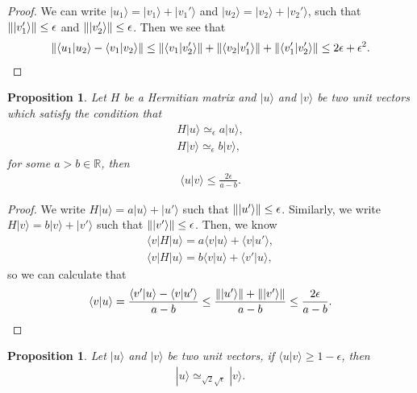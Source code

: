 \documentclass[11pt,letterpaper]{article}
\newcommand{\ket}[1]{|#1\rangle}
\newcommand{\bra}[1]{\langle#1|}
\newcommand{\braket}[2]{\langle#1|#2\rangle}
\DeclarePairedDelimiter{\norm}{\lVert}{\rVert}
\newcommand{\R}{\mathbb{R}}
\newcommand{\1}{\mathbb{1}}
\newcommand{\ep}{\epsilon}
\newcommand{\se}{\sqrt{\epsilon}}
\newcommand{\appd}[1]{\simeq_{#1}}
\newtheorem{proposition}[theorem]{Proposition}
\theoremstyle{definition}
\begin{document}
\begin{proof}
	We can write $\ket{u_1} = \ket{v_1} + \ket{v_1'}$ and $\ket{u_2} = \ket{v_2} + \ket{v_2'}$,
	such that $\norm{\ket{v_1'}} \leq \ep$ and $\norm{\ket{v_2'}} \leq \ep$. Then we see that 
	\begin{align}
		\norm{ \braket{u_1}{u_2} - \braket{v_1}{v_2} } \leq 
		\norm{\braket{v_1}{v_2'}} + \norm{\braket{v_2}{v_1'}} + \norm{\braket{v_1'}{v_2'}}
		\leq  2\ep + \ep^2. 
	\end{align}
\end{proof}
\begin{proposition}
\label{prop:orthog}
	Let $H$ be a Hermitian matrix and $\ket{u}$ and $\ket{v}$ be two unit vectors
	which satisfy the condition that 
	\begin{align}
		H\ket{u} \appd{\epsilon} a \ket{u}, \\
		H\ket{v} \appd{\epsilon} b \ket{v}, 
	\end{align}
	for some $a > b \in \R$, then
	\begin{align}
		\braket{u}{v} \leq \frac{2\epsilon}{a-b}.
	\end{align}
\end{proposition}
\begin{proof}
	We write $H\ket{u} = a\ket{u} + \ket{u'}$ such that $\norm{\ket{u'}} \leq \epsilon$.
	Similarly, we write $H\ket{v} = b\ket{v} + \ket{v'}$ such that $\norm{\ket{v'}} \leq \epsilon$.
	Then, we know
	\begin{align}
		\bra{v}H\ket{u} = a\braket{v}{u} + \braket{v}{u'},\\
		\bra{v}H\ket{u}  =b\braket{v}{u} + \braket{v'}{u},
	\end{align}
	so we can calculate that
	\begin{align}
		\braket{v}{u} = \frac{\braket{v'}{u} -  \braket{v}{u'}}{a-b} \leq \frac{\norm{\ket{u'}}+\norm{\ket{v'}}}{a-b} 
		\leq \frac{2\epsilon}{a-b}.
	\end{align}
\end{proof}
\begin{proposition}
	Let $\ket{u}$ and $\ket{v}$ be two unit vectors, if $\braket{u}{v} \geq 1 - \ep$,
	then
	\begin{align}
		\ket{u} \appd{\sqrt{2} \se} \ket{v}.
	\end{align}
\end{proposition}
\end{document}
